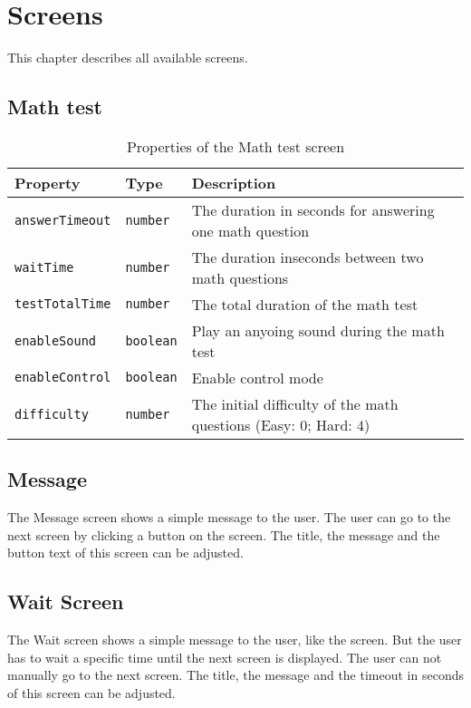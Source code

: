 \section{Screens}
\label{sec:screens}

This chapter describes all available screens.

\subsection{Math test}
\label{sec:screens-math-test}

\begin{table}[ht]
  \begin{tabularx}{\textwidth}{l|l|X}
    Property & Type & Description \\
    \hline
    \texttt{answerTimeout} & \texttt{number} & The duration in seconds for answering one math question \\
    \texttt{waitTime} & \texttt{number} & The duration inseconds between two math questions \\
    \texttt{testTotalTime} & \texttt{number} & The total duration of the math test \\
    \texttt{enableSound} & \texttt{boolean} & Play an anyoing sound during the math test \\
    \texttt{enableControl} & \texttt{boolean} & Enable control mode \\
    \texttt{difficulty} & \texttt{number} & The initial difficulty of the math questions (Easy: $0$; Hard: $4$) \\
  \end{tabularx}
  \caption{Properties of the Math test screen}
\end{table}

\subsection{Message}
\label{sec:screens-message}
The Message screen shows a simple message to the user.
The user can go to the next screen by clicking a button on the screen.
The title, the message and the button text of this screen can be adjusted.

\subsection{Wait Screen}
\label{sec:screens-wait-screen}

The Wait screen shows a simple message to the user, like the  screen.
But the user has to wait a specific time until the next screen is displayed.
The user can not manually go to the next screen.
The title, the message and the timeout in seconds of this screen can be adjusted.

